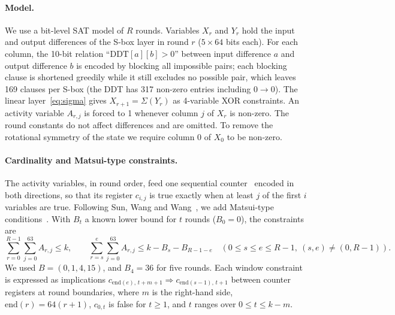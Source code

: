 \documentclass[11pt,a4paper]{article}
\begin{document}
\paragraph{Model.} We use a bit-level SAT model of $R$ rounds. Variables $X_r$ and $Y_r$ hold the
input and output differences of the S-box layer in round $r$ ($5\times64$ bits each). For each
column, the 10-bit relation ``$\mathrm{DDT}[a][b]>0$'' between input difference $a$ and output
difference $b$ is encoded by blocking all impossible pairs; each blocking clause is shortened
greedily while it still excludes no possible pair, which leaves 169 clauses per S-box (the DDT has
317 non-zero entries including $0\to0$). The linear layer~\eqref{eq:sigma} gives $X_{r+1}=\Sigma(Y_r)$ as 4-variable
XOR constraints. An activity variable $A_{r,j}$ is forced to 1 whenever column $j$ of $X_r$ is
non-zero. The round constants do not affect differences and are omitted. To remove the rotational
symmetry of the state we require column 0 of $X_0$ to be non-zero.

\paragraph{Cardinality and Matsui-type constraints.} The activity variables, in round order, feed
one sequential counter~\cite{Sinz05} encoded in both directions, so that its register $c_{i,j}$
is true exactly when at least $j$ of the first $i$ variables are true. Following Sun, Wang and Wang~\cite{SWW21}, we add Matsui-type conditions~\cite{Mat94}. With
$B_t$ a known lower bound for $t$ rounds ($B_0=0$), the constraints are
\begin{equation}\label{eq:card}
\sum_{r=0}^{R-1}\sum_{j=0}^{63}A_{r,j}\le k,\qquad
\sum_{r=s}^{e}\sum_{j=0}^{63}A_{r,j}\le k-B_s-B_{R-1-e}\quad
(0\le s\le e\le R-1,\ (s,e)\neq(0,R-1)).
\end{equation}
We used $B=(0,1,4,15)$, and $B_4=36$ for five rounds. Each window constraint is expressed as
implications $c_{\mathrm{end}(e),\,t+m+1}\Rightarrow c_{\mathrm{end}(s-1),\,t+1}$ between counter
registers at round boundaries, where $m$ is the right-hand side, $\mathrm{end}(r)=64(r+1)$,
$c_{0,t}$ is false for $t\ge1$, and $t$ ranges over $0\le t\le k-m$.
\end{document}
